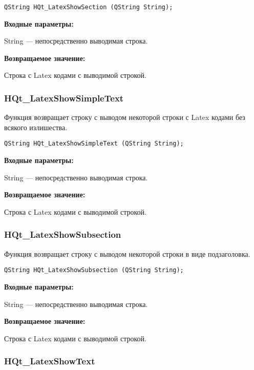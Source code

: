 \documentclass[a4paper,12pt]{article}
\begin{document}
\begin{lstlisting}[label=code_syntax_HQt_LatexShowSection,caption=Синтаксис]
QString HQt_LatexShowSection (QString String);
\end{lstlisting}

\textbf{Входные параметры:}

String --- непосредственно выводимая строка.

\textbf{Возвращаемое значение:}

Строка с Latex кодами с выводимой строкой.


\subsubsection{HQt\_LatexShowSimpleText}\label{HQt_LatexShowSimpleText}

Функция возвращает строку с выводом некоторой строки с Latex кодами без всякого излишества.


\begin{lstlisting}[label=code_syntax_HQt_LatexShowSimpleText,caption=Синтаксис]
QString HQt_LatexShowSimpleText (QString String);
\end{lstlisting}

\textbf{Входные параметры:}

String --- непосредственно выводимая строка.

\textbf{Возвращаемое значение:}

Строка с Latex кодами с выводимой строкой.


\subsubsection{HQt\_LatexShowSubsection}\label{HQt_LatexShowSubsection}

Функция возвращает строку с выводом некоторой строки в виде подзаголовка.


\begin{lstlisting}[label=code_syntax_HQt_LatexShowSubsection,caption=Синтаксис]
QString HQt_LatexShowSubsection (QString String);
\end{lstlisting}

\textbf{Входные параметры:}

String --- непосредственно выводимая строка.

\textbf{Возвращаемое значение:}

Строка с Latex кодами с выводимой строкой.


\subsubsection{HQt\_LatexShowText}\label{HQt_LatexShowText}
\end{document}

